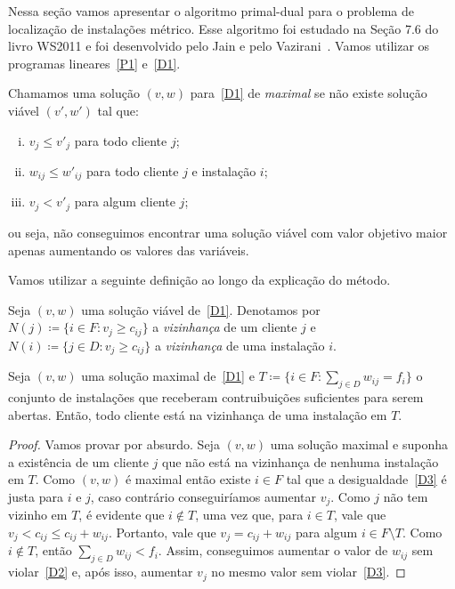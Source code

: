 Nessa seção vamos apresentar o algoritmo primal-dual para o problema de localização de instalações métrico. Esse algoritmo foi estudado na Seção 7.6 do livro WS2011 e foi desenvolvido pelo Jain e pelo Vazirani~\cite{JV}. Vamos utilizar os programas lineares~\eqref{P1} e~\eqref{D1}.

Chamamos uma solução $(v,w)$ para~\eqref{D1} de \emph{maximal} se não existe solução viável $(v',w')$ tal que:
\begin{enumerate}[(i)]
    \item $v_j \leq v'_j$ para todo cliente $j$;
    \item $w_{ij} \leq w'_{ij}$ para todo cliente $j$ e instalação $i$;
    \item $v_j < v'_j$ para algum cliente $j$;
\end{enumerate}
ou seja, não conseguimos encontrar uma solução viável com valor objetivo maior apenas aumentando os valores das variáveis.

Vamos utilizar a seguinte definição ao longo da explicação do método.
\begin{definition}
    Seja $(v,w)$ uma solução viável de~\eqref{D1}. Denotamos por ${N(j) \coloneqq \{i \in F:v_j \geq c_{ij}\}}$ a \emph{vizinhança} de um cliente $j$ e $N(i) \coloneqq \{j \in D:v_j \geq c_{ij}\}$ a \emph{vizinhança} de uma instalação $i$.
\end{definition}

\begin{theorem}
    Seja $(v,w)$ uma solução maximal de~\eqref{D1} e ${T \coloneqq \{i \in F: \sum_{j \in D} w_{ij} = f_i\}}$ o conjunto de instalações que receberam contruibuições suficientes para serem abertas. Então, todo cliente está na vizinhança de uma instalação em $T$. 
\end{theorem}
\begin{proof}
    Vamos provar por absurdo. Seja $(v,w)$ uma solução maximal e suponha a existência de um cliente $j$ que não está na vizinhança de nenhuma instalação em $T$. Como $(v,w)$ é maximal então existe $i \in F$ tal que a desigualdade~\eqref{D3} é justa para $i$ e $j$, caso contrário conseguiríamos aumentar $v_j$. Como $j$ não tem vizinho em $T$, é evidente que $i \not \in T$, uma vez que, para $i \in T$, vale que $v_j < c_{ij} \leq c_{ij} + w_{ij}$. Portanto, vale que $v_j = c_{ij} + w_{ij}$ para algum $i \in F \setminus T$. Como $ i \not \in T$, então $\sum_{j \in D} w_{ij} < f_i$. Assim, conseguimos aumentar o valor de $w_{ij}$ sem violar~\eqref{D2} e, após isso, aumentar $v_j$ no mesmo valor sem violar~\eqref{D3}.
\end{proof}

